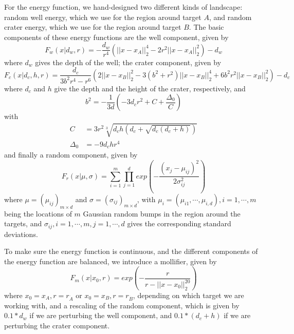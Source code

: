 \documentclass[12pt, nofootinbib,english, amsmath, amssymb, aps, priprint, graphicx,floatfix]{revtex4-1}
\theoremstyle{plain}
\theoremstyle{definition}
\theoremstyle{plain}
\begin{document}
{For the energy function, we hand-designed two different kinds of landscape: random well energy, which we use for the region around target $A$, and random crater energy, which we use for the region around target $B$. The basic components of these energy functions are the well component, given by
\begin{equation}
F_w(x|d_w, r) = -\frac{d_w}{r^4}(||x - x_A||_2^4 - 2r^2||x - x_A||_2^2) - d_w
\end{equation}
where $d_w$ gives the depth of the well; the crater component, given by
\begin{equation}
F_c(x|d_c, h, r) = \frac{d_c}{3b^2r^4 - r^6}(2||x - x_B||_2^2 - 3(b^2 + r^2)||x - x_B||_2^4 + 6b^2r^2||x - x_B||_2^2) - d_c
\end{equation}
where $d_c$ and $h$ give the depth and the height of the crater, respectively, and
\begin{equation}
b^2 = -\frac{1}{3d}(-3 d_c r^2 + C + \frac{\Delta_0}{C})
\end{equation}
with
\begin{align*}
C &= 3r^2 \sqrt[3]{d_c h (d_c + \sqrt{d_c (d_c + h)})} \\
\Delta_0 &= -9 d_c h r^4
\end{align*}
and finally a random component, given by
\begin{equation}
F_r(x|\mu, \sigma) = \sum_{i=1}^m\prod_{j=1}^d exp(-\frac{(x_j - \mu_{i j})^2}{2\sigma_{i j}^2})
\end{equation}
where $\mu=(\mu_{i j})_{m \times d}$ and $\sigma=(\sigma_{i j})_{m \times d}$, with $\mu_i=(\mu_{i 1}, \cdots, \mu_{i, d}), i=1, \cdots, m$ being the locations of $m$ Gaussian random bumps in the region around the targets, and $\sigma_{i j}, i=1, \cdots, m, j=1, \cdots, d$ gives the corresponding standard deviations.

To make sure the energy function is continuous, and the different components of the energy function are balanced, we introduce a mollifier, given by
\begin{equation}
F_m(x|x_0, r) = exp(-\frac{r}{r - ||x - x_0||_2^{20}})
\end{equation}
where $x_0=x_A, r=r_{\dot A}$ or $x_0=x_B, r=r_{\dot B}$, depending on which target we are working with, and a rescaling of the random component, which is given by $0.1 * d_w$ if we are perturbing the well component, and $0.1 * (d_c + h)$ if we are perturbing the crater component.

}
\end{document}
